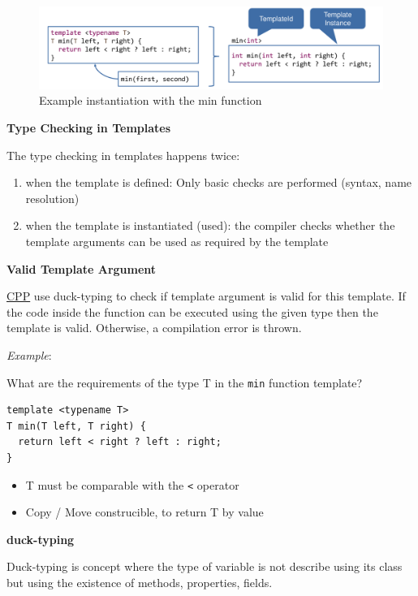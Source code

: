 \documentclass[11pt,twoside,landscape]{article}
\begin{document}
\begin{multicols}{3}
\begin{figure}[htbp]
\centering
\includegraphics[width=.9\linewidth]{img/template_instantiation.png}
\caption{Example instantiation with the min function}
\end{figure}

\textbf{Type Checking in Templates}

The type checking in templates happens twice:
\begin{enumerate}
\item when the template is defined: Only basic checks are performed (syntax, name resolution)
\item when the template is instantiated (used): the compiler checks whether the template arguments can be used as required by the template
\end{enumerate}


\textbf{Valid Template Argument}

\href{../../../roam/20210920103243-c.org}{CPP} use duck-typing to check if template argument is valid for this template.
If the code inside the function can be executed using the given type then the template is valid.
Otherwise, a compilation error is thrown.

\emph{Example}: 

What are the requirements of the type T in the \texttt{min} function template?
\lstset{language=c++,label= ,caption= ,captionpos=b,numbers=none}
\begin{lstlisting}
template <typename T>
T min(T left, T right) {
  return left < right ? left : right;
}
\end{lstlisting}

\begin{itemize}
\item T must be comparable with the \texttt{<} operator
\item Copy / Move construcible, to return T by value
\end{itemize}


\textbf{duck-typing}

Duck-typing is concept where the type of variable is not describe using its class but using the existence of methods, properties, fields.


\end{multicols}
\end{document}

